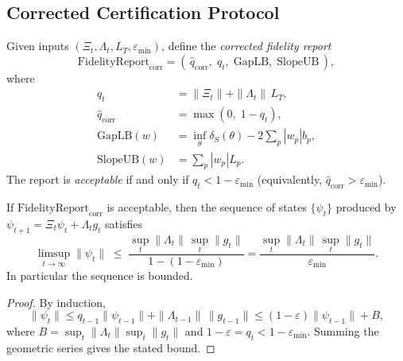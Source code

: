 \documentclass[11pt]{article}
\begin{document}
\subsection{Corrected Certification Protocol}
\label{sec:certprotocol}

\begin{definition}
\label{def:correctedfidelity}
Given inputs $(\Xi_{t},\Lambda_{t},L_{T},\varepsilon_{\min})$,
define the \emph{corrected fidelity report}
\[
\mathrm{FidelityReport}_{\mathrm{corr}}
= \left(\,\hat{q}_{\mathrm{corr}},\;
         q_{t},\;
         \mathrm{GapLB},\;
         \mathrm{SlopeUB}\,\right),
\]
where
\begin{align}
q_{t} &= \|\Xi_{t}\| + \|\Lambda_{t}\|\,L_{T}, \\
\hat{q}_{\mathrm{corr}} &= \max(0,\;1 - q_{t}), \\
\mathrm{GapLB}(w) &= \inf_{\theta}\delta_{S}(\theta) - 2\sum_{p}|w_{p}|b_{p}, \\
\mathrm{SlopeUB}(w) &= \sum_{p}|w_{p}|L_{p}.
\end{align}
The report is \emph{acceptable} if and only if
$q_{t} < 1-\varepsilon_{\min}$ (equivalently, $\hat{q}_{\mathrm{corr}}>\varepsilon_{\min}$).
\end{definition}

\begin{proposition}
\label{prop:sufficiency}
If $\mathrm{FidelityReport}_{\mathrm{corr}}$ is acceptable,
then the sequence of states $\{\psi_{t}\}$ produced by
$\psi_{t+1}=\Xi_{t}\psi_{t}+\Lambda_{t}g_{t}$ satisfies
\[
\limsup_{t\to\infty}\|\psi_{t}\| \;\leq\;
\frac{\sup_{t}\|\Lambda_{t}\|\,\sup_{t}\|g_{t}\|}{1-(1-\varepsilon_{\min})}
= \frac{\sup_{t}\|\Lambda_{t}\|\,\sup_{t}\|g_{t}\|}{\varepsilon_{\min}}.
\]
In particular the sequence is bounded.
\end{proposition}

\begin{proof}
By induction,
\[
\|\psi_{t}\| \leq q_{t-1}\|\psi_{t-1}\| + \|\Lambda_{t-1}\|\,\|g_{t-1}\|
\leq (1-\varepsilon)\|\psi_{t-1}\| + B,
\]
where $B=\sup_{t}\|\Lambda_{t}\|\sup_{t}\|g_{t}\|$
and $1-\varepsilon = q_{t} < 1-\varepsilon_{\min}$.
Summing the geometric series gives the stated bound.
\end{proof}

\end{document}
